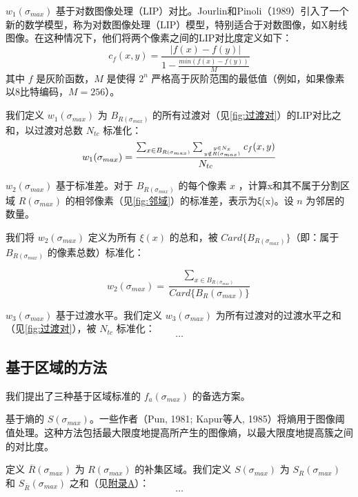 $w_1(\sigma_{max})$ 基于对数图像处理（LIP）对比。Jourlin和Pinoli（1989）\cite{jourlin1989contrast}引入了一个新的数学模型，称为对数图像处理（LIP）模型，特别适合于对数图像，如X射线图像。在这种情况下，他们将两个像素之间的LIP对比度定义如下：
\begin{equation}
    c_f(x,y)=\frac{|f(x)-f(y)|}{1-\frac{min(f(x)-f(y))}{M}}
\end{equation}
其中 $f$ 是灰阶函数，$M$ 是使得 $2^n$ 严格高于灰阶范围的最低值（例如，如果像素以8比特编码，$M=256$）。

我们定义 $w_1(\sigma_{max})$ 为 $B_{R(\sigma_{max})}$ 的所有过渡对（见\cref{fig:过渡对}）的LIP对比之和，以过渡对总数 $N_{tc}$ 标准化：
\begin{equation}
    w_1(\sigma_{max})=\frac{\sum_{x \in B_{R(\sigma_{max})}} \sum_{y \in N_x \atop y \notin R(\sigma_{max})} c_f(x,y) } {N_{tc}}
\end{equation}

$w_2(\sigma_{max})$ 基于标准差。对于 $B_{R(\sigma_{max})}$ 的每个像素 $x$ ，计算x和其不属于分割区域 $R(\sigma_{max})$ 的相邻像素（见\cref{fig:邻域}）的标准差，表示为ξ(x)。设 $n$ 为邻居的数量。

我们将 $w_2(\sigma_{max})$ 定义为所有 $\xi (x)$ 的总和，被 $Card\{B_{R(\sigma_{max})}\}$（即：属于 $B_{R(\sigma_{max})}$ 的像素总数）标准化：

\begin{equation}
    w_2(\sigma_{max})=\frac{\sum_{x \in B_{R(\sigma_{max})}}}{Card\{B_R(\sigma_{max})\}}
\end{equation}

$w_3(\sigma_{max})$ 基于过渡水平。我们定义 $w_3(\sigma_{max})$ 为所有过渡对的过渡水平之和（见\cref{fig:过渡对}），被 $N_{tc}$ 标准化：
\begin{equation}
    \dots
\end{equation}

\subsection{基于区域的方法}

我们提出了三种基于区域标准的 $f_{a}(\sigma_{max})$ 的备选方案。

基于熵的 $S(\sigma_{max})$。一些作者（Pun, 1981\cite{pun1981entropic}; Kapur等人, 1985\cite{kapur1985new}）将熵用于图像阈值处理。这种方法包括最大限度地提高所产生的图像熵，以最大限度地提高簇之间的对比度。

定义 $\overline{R}(\sigma_{max})$ 为 $R(\sigma_{max})$ 的补集区域。我们定义 $S(\sigma_{max})$ 为 $S_{R}(\sigma_{max})$ 和 $S_{\overline{R}}(\sigma_{max})$ 之和（见\hyperref[sec:appendix_a]{附录A}）：
\begin{equation}
    \dots
\end{equation}

